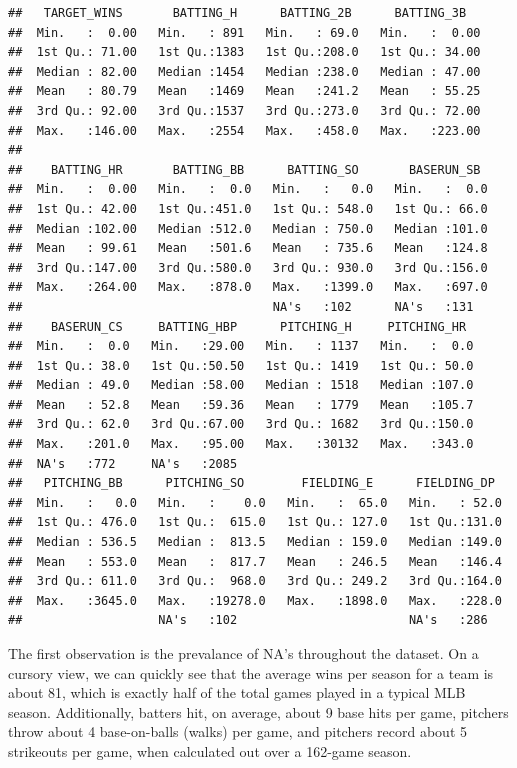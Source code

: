 \documentclass[
]{article}
\begin{document}
\begin{verbatim}
##   TARGET_WINS       BATTING_H      BATTING_2B      BATTING_3B    
##  Min.   :  0.00   Min.   : 891   Min.   : 69.0   Min.   :  0.00  
##  1st Qu.: 71.00   1st Qu.:1383   1st Qu.:208.0   1st Qu.: 34.00  
##  Median : 82.00   Median :1454   Median :238.0   Median : 47.00  
##  Mean   : 80.79   Mean   :1469   Mean   :241.2   Mean   : 55.25  
##  3rd Qu.: 92.00   3rd Qu.:1537   3rd Qu.:273.0   3rd Qu.: 72.00  
##  Max.   :146.00   Max.   :2554   Max.   :458.0   Max.   :223.00  
##                                                                  
##    BATTING_HR       BATTING_BB      BATTING_SO       BASERUN_SB   
##  Min.   :  0.00   Min.   :  0.0   Min.   :   0.0   Min.   :  0.0  
##  1st Qu.: 42.00   1st Qu.:451.0   1st Qu.: 548.0   1st Qu.: 66.0  
##  Median :102.00   Median :512.0   Median : 750.0   Median :101.0  
##  Mean   : 99.61   Mean   :501.6   Mean   : 735.6   Mean   :124.8  
##  3rd Qu.:147.00   3rd Qu.:580.0   3rd Qu.: 930.0   3rd Qu.:156.0  
##  Max.   :264.00   Max.   :878.0   Max.   :1399.0   Max.   :697.0  
##                                   NA's   :102      NA's   :131    
##    BASERUN_CS     BATTING_HBP      PITCHING_H     PITCHING_HR   
##  Min.   :  0.0   Min.   :29.00   Min.   : 1137   Min.   :  0.0  
##  1st Qu.: 38.0   1st Qu.:50.50   1st Qu.: 1419   1st Qu.: 50.0  
##  Median : 49.0   Median :58.00   Median : 1518   Median :107.0  
##  Mean   : 52.8   Mean   :59.36   Mean   : 1779   Mean   :105.7  
##  3rd Qu.: 62.0   3rd Qu.:67.00   3rd Qu.: 1682   3rd Qu.:150.0  
##  Max.   :201.0   Max.   :95.00   Max.   :30132   Max.   :343.0  
##  NA's   :772     NA's   :2085                                   
##   PITCHING_BB      PITCHING_SO        FIELDING_E      FIELDING_DP   
##  Min.   :   0.0   Min.   :    0.0   Min.   :  65.0   Min.   : 52.0  
##  1st Qu.: 476.0   1st Qu.:  615.0   1st Qu.: 127.0   1st Qu.:131.0  
##  Median : 536.5   Median :  813.5   Median : 159.0   Median :149.0  
##  Mean   : 553.0   Mean   :  817.7   Mean   : 246.5   Mean   :146.4  
##  3rd Qu.: 611.0   3rd Qu.:  968.0   3rd Qu.: 249.2   3rd Qu.:164.0  
##  Max.   :3645.0   Max.   :19278.0   Max.   :1898.0   Max.   :228.0  
##                   NA's   :102                        NA's   :286
\end{verbatim}

The first observation is the prevalance of NA's throughout the dataset.
On a cursory view, we can quickly see that the average wins per season
for a team is about 81, which is exactly half of the total games played
in a typical MLB season. Additionally, batters hit, on average, about 9
base hits per game, pitchers throw about 4 base-on-balls (walks) per
game, and pitchers record about 5 strikeouts per game, when calculated
out over a 162-game season.
\end{document}
